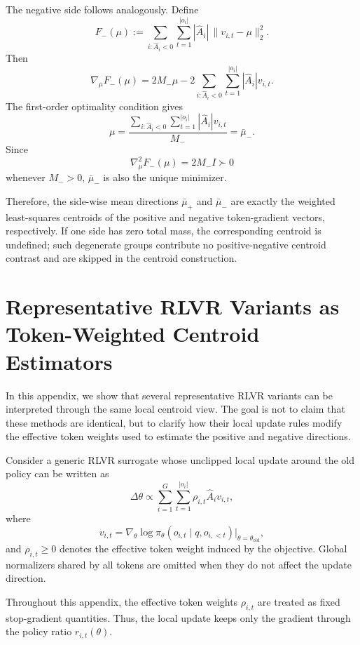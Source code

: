 \documentclass{llmxive}
\begin{document}
The negative side follows analogously. Define
\[
F_-(\mu)
:=
\sum_{i:\hat A_i<0}\sum_{t=1}^{|o_i|}
|\hat A_i|\,\|v_{i,t}-\mu\|_2^2.
\]
Then
\[
\nabla_\mu F_-(\mu)
=
2M_-\mu
-
2\sum_{i:\hat A_i<0}\sum_{t=1}^{|o_i|}
|\hat A_i| v_{i,t}.
\]
The first-order optimality condition gives
\[
\mu
=
\frac{
\sum_{i:\hat A_i<0}\sum_{t=1}^{|o_i|}
|\hat A_i| v_{i,t}
}{
M_-
}
=
\bar\mu_-.
\]
Since
\[
\nabla_\mu^2 F_-(\mu)
=
2M_- I
\succ 0
\]
whenever \(M_->0\), \(\bar\mu_-\) is also the unique minimizer.

Therefore, the side-wise mean directions \(\bar\mu_+\) and \(\bar\mu_-\)
are exactly the weighted least-squares centroids of the positive and negative
token-gradient vectors, respectively. If one side has zero total mass, the
corresponding centroid is undefined; such degenerate groups contribute no
positive-negative centroid contrast and are skipped in the centroid
construction.

\section{Representative RLVR Variants as Token-Weighted Centroid Estimators}
\label{app:centroid-view-rlvr}

In this appendix, we show that several representative RLVR variants can be
interpreted through the same local centroid view. The goal is not to claim that
these methods are identical, but to clarify how their local update rules modify
the effective token weights used to estimate the positive and negative
directions.


Consider a generic RLVR surrogate whose unclipped local update around the old
policy can be written as
\begin{equation}
\label{eq:generic-local-update}
\Delta\theta
\propto
\sum_{i=1}^{G}\sum_{t=1}^{|o_i|}
\rho_{i,t}\hat A_i v_{i,t},
\end{equation}
where
\[
v_{i,t}
=
\nabla_\theta
\log \pi_\theta(o_{i,t}\mid q,o_{i,<t})
\Big|_{\theta=\theta_{\mathrm{old}}},
\]
and \(\rho_{i,t}\ge 0\) denotes the effective token weight induced by the
objective. Global normalizers shared by all tokens are omitted when they do not
affect the update direction. 

Throughout this appendix, the effective token weights \(\rho_{i,t}\) are treated
as fixed stop-gradient quantities. Thus, the local update keeps only the gradient through the policy
ratio \(r_{i,t}(\theta)\). 
\end{document}
